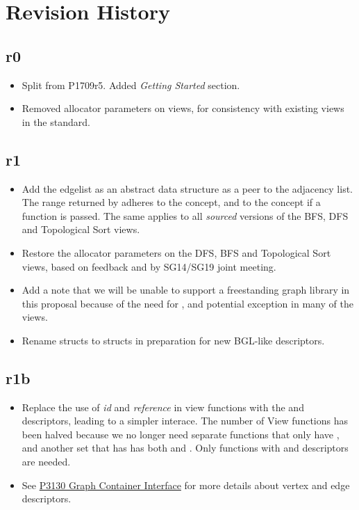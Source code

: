 \section{Revision History}

\subsection*{\paperno r0}

\begin{itemize}
      \item Split from P1709r5. Added \textit{Getting Started} section.
      \item Removed allocator parameters on views, for consistency with existing views in the standard. 
\end{itemize}

\subsection*{\paperno r1}
\begin{itemize}
      \item Add the edgelist as an abstract data structure as a peer to the adjacency list. 
            The range returned by  adheres to the  concept,
            and to the  concept if a  function is passed. The same applies to
            all \textit{sourced} versions of the BFS, DFS and Topological Sort views.
      \item Restore the allocator parameters on the DFS, BFS and Topological Sort views, based on feedback and 
            by SG14/SG19 joint meeting.
      \item Add a note that we will be unable to support a freestanding graph library in this proposal because
            of the need for ,  and potential  exception in many of 
            the views.
      \item Rename  structs to  structs in preparation for new BGL-like descriptors.
\end{itemize}

\subsection*{\paperno r1b}
\begin{itemize}
    \item Replace the use of \textit{id} and \textit{reference} in view functions with the 
           and  descriptors, leading to a simpler interace. 
          The number of View functions has been halved because we no longer need separate functions that 
          only have , and another set that has has both  and . Only functions
          with  and  descriptors are needed.
    \item See \href{https://www.wg21.link/P3130}{P3130 Graph Container Interface} for more details about
          vertex and edge descriptors.
\end{itemize}

